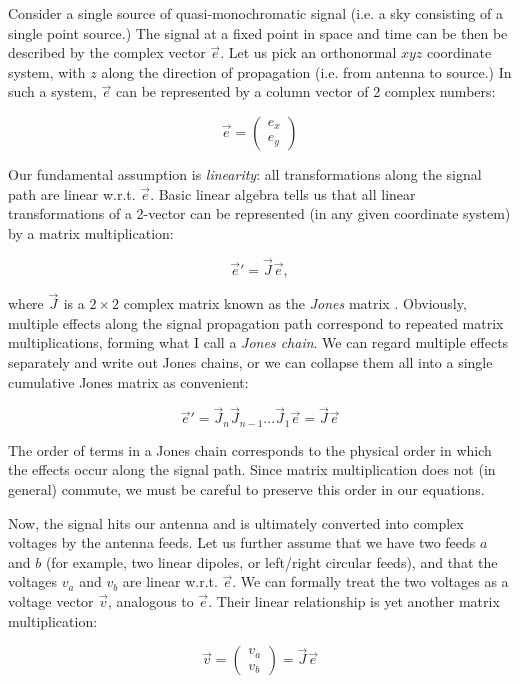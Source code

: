 \documentclass[]{aa}
\newcommand{\jones}[2]{\vec {#1}_{#2}}
\begin{document}
Consider a single source of quasi-monochromatic signal (i.e. a sky consisting of a single point source.) The signal at a fixed point in space and time can be then be described by the complex vector $\vec e$. Let us pick an orthonormal $xyz$ coordinate system, with $z$ along the direction of propagation (i.e. from antenna to source.) In such a system, $\vec e$ can be represented by a column vector of 2 complex numbers:

\[
\vec e = \left( \begin{array}{c}e_x\\e_y\end{array} \right) 
\]

Our fundamental assumption is {\em linearity}: all transformations along the signal path are linear w.r.t. $\vec e$. Basic linear algebra tells us that all linear transformations of a 2-vector can be represented (in any given coordinate system) by a matrix multiplication:

\[
\vec e' = \jones{J}{} \vec e,
\]

where $\jones{J}{}$ is a $2\times2$ complex matrix known as the {\em Jones} matrix \citep{jones}. Obviously, multiple effects along the signal propagation path correspond to repeated matrix multiplications, forming what I call a {\em Jones chain}. We can regard multiple effects separately and write out Jones chains, or we can collapse them all into a single cumulative Jones matrix as convenient:

\begin{equation}\label{eq:jones-chain}
\vec e' = \jones{J}{n} \jones{J}{n-1} ... \jones{J}{1} \vec e = \jones{J}{} \vec e
\end{equation}

The order of terms in a Jones chain corresponds to the physical order in which the effects occur along the signal path. Since matrix multiplication does not (in general) commute, we must be careful to preserve this order in our equations.

Now, the signal hits our antenna and is ultimately converted into complex voltages by the antenna feeds. Let us further assume that we have two feeds $a$ and $b$ (for example, two linear dipoles, or left/right circular feeds), and that the voltages $v_a$ and $v_b$ are linear w.r.t. $\vec e$. We can formally treat the two voltages as a voltage vector $\vec v$, analogous to $\vec e$. Their linear relationship is yet another matrix multiplication:

\begin{equation}\label{eq:e-voltage}
\vec v = \left( \begin{array}{c}v_a\\v_b\end{array} \right) = \jones{J}{} \vec e
\end{equation}
 
\end{document}
